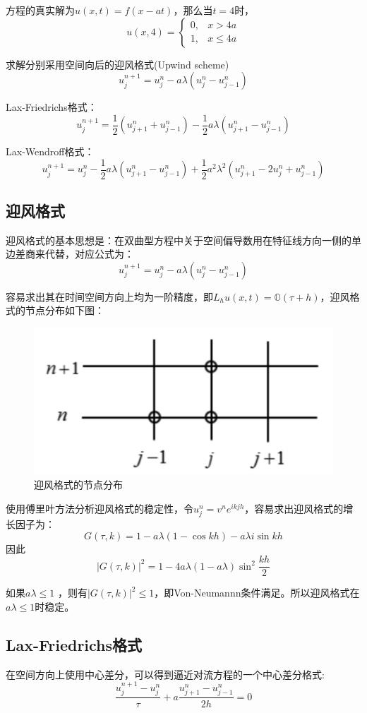\documentclass[fontset=mac]{ctexart}
\begin{document}
	方程的真实解为$u(x,t)=f(x-at)$，那么当$t=4$时，
	$$
	u(x, 4)=\left\{\begin{array}{ll}
		0, & x>4 a \\
		1, & x \leq 4 a
	\end{array}\right.
	$$
	
	求解分别采用空间向后的迎风格式(Upwind scheme)
	$$
	u_{j}^{n+1}=u_{j}^{n}-a \lambda\left(u_{j}^{n}-u_{j-1}^{n}\right)
	$$
	
	Lax-Friedrichs格式：
	$$
	u_{j}^{n+1}=\frac{1}{2}\left(u_{j+1}^{n}+u_{j-1}^{n}\right)-\frac{1}{2} a \lambda\left(u_{j+1}^{n}-u_{j-1}^{n}\right)
	$$
	
	Lax-Wendroff格式：
	$$
	u_{j}^{n+1}=u_{j}^{n}-\frac{1}{2} a \lambda\left(u_{j+1}^{n}-u_{j-1}^{n}\right)+\frac{1}{2} a^{2} \lambda^{2}\left(u_{j+1}^{n}-2 u_{j}^{n}+u_{j-1}^{n}\right)
	$$
	
	\subsection{迎风格式}
	迎风格式的基本思想是：在双曲型方程中关于空间偏导数用在特征线方向一侧的单边差商来代替，对应公式为：
	$$
	u_{j}^{n+1}=u_{j}^{n}-a \lambda\left(u_{j}^{n}-u_{j-1}^{n}\right)
	$$
	
	容易求出其在时间空间方向上均为一阶精度，即$L_h u (x,t)=\mathbb{O}(\tau + h)$，迎风格式的节点分布如下图：
	\begin{figure}[H]
		\centering
		\includegraphics[width=0.7\linewidth]{fig/fig2}
		\caption{迎风格式的节点分布}
	\end{figure}

	使用傅里叶方法分析迎风格式的稳定性，令$u_{j}^{n}=v^{n} e^{i k j h}$，容易求出迎风格式的增长因子为：
	$$
	G(\tau, k)=1-a \lambda(1-\cos k h)-a \lambda i \sin k h
	$$
	因此
	$$
	|G(\tau, k)|^{2}=1-4 a \lambda(1-a \lambda) \sin ^{2} \frac{k h}{2}
	$$
	
	如果$a\lambda \le 1$ ，则有$|G(\tau, k)|^2 \le 1$，即Von-Neumannn条件满足。所以迎风格式在$a \lambda \le 1$时稳定。
	
	\subsection{Lax-Friedrichs格式}
	在空间方向上使用中心差分，可以得到逼近对流方程的一个中心差分格式:
	$$
	\frac{u_{j}^{n+1}-u_{j}^{n}}{\tau}+a \frac{u_{j+1}^{n}-u_{j-1}^{n}}{2 h}=0
	$$
	
\end{document}
